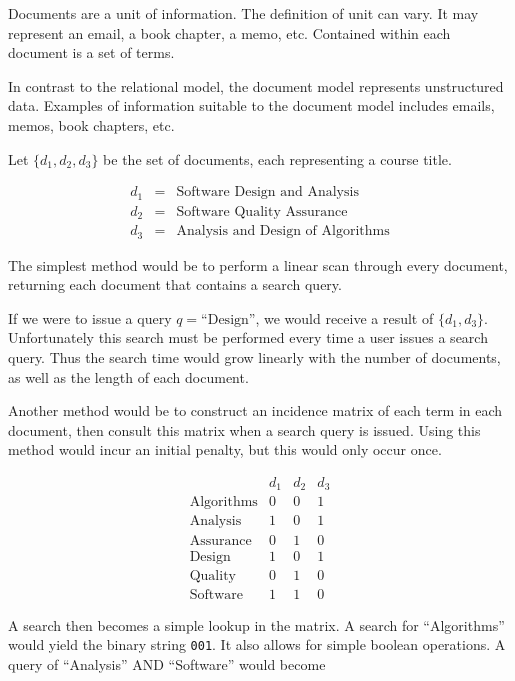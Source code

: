 	Documents are a unit of information.  The definition of unit can vary.  It may represent an email, a book chapter, a memo, etc.  Contained within each document is a set of terms.
	
	In contrast to the relational model, the document model represents unstructured data.  Examples of information suitable to the document model includes emails, memos, book chapters, etc.
	
	\begin{ex}
		Let $\{d_1, d_2, d_3\}$ be the set of documents, each representing a course title.
		
		\begin{eqnarray*}
			d_1 &=& \textrm{Software Design and Analysis} \\
			d_2 &=& \textrm{Software Quality Assurance} \\
			d_3 &=& \textrm{Analysis and Design of Algorithms}
		\end{eqnarray*}
		
		The simplest method would be to perform a linear scan through every document, returning each document that contains a search query.
		
		If we were to issue a query $q = \textrm{``Design''}$, we would receive a result of $\{d_1, d_3\}$.  Unfortunately this search must be performed every time a user issues a search query.  Thus the search time would grow linearly with the number of documents, as well as the length of each document.
		
		Another method would be to construct an incidence matrix of each term in each document, then consult this matrix when a search query is issued.  Using this method would incur an initial penalty, but this would only occur once.
		
		$$
			\begin{array}{lccc}
				& d_1 & d_2 & d_3 \\
				\textrm{Algorithms} & 0 & 0 & 1 \\
				\textrm{Analysis} & 1 & 0 & 1 \\
				\textrm{Assurance} & 0 & 1 & 0 \\
				\textrm{Design} & 1 & 0 & 1 \\
				\textrm{Quality} & 0 & 1 & 0 \\
				\textrm{Software} & 1 & 1 & 0
			\end{array}
		$$
		
		A search then becomes a simple lookup in the matrix.  A search for ``Algorithms'' would yield the binary string \texttt{001}.  It also allows for simple boolean operations.  A query of ``Analysis'' \textsc{AND} ``Software'' would become
		

\end{ex}
